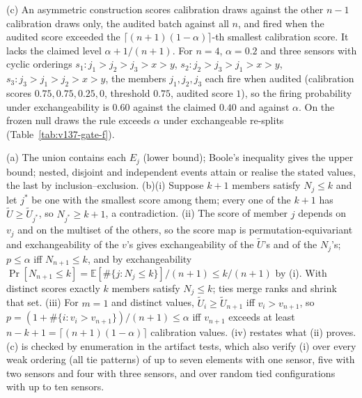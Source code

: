 \documentclass[10pt,journal,compsoc]{IEEEtran}
\begin{document}
(c) An asymmetric construction scores calibration draws against the other
$n-1$ calibration draws only, the audited batch against all $n$, and fired
when the audited score exceeded the $\lceil(n+1)(1-\alpha)\rceil$-th smallest
calibration score. It lacks the claimed level $\alpha+1/(n+1)$.
For $n=4$, $\alpha=0.2$ and three sensors with cyclic orderings
$s_1: j_1>j_2>j_3>x>y$, $s_2: j_2>j_3>j_1>x>y$, $s_3: j_3>j_1>j_2>x>y$,
the members $j_1,j_2,j_3$ each fire when audited (calibration scores
$0.75,0.75,0.25,0$, threshold $0.75$, audited score $1$), so the firing
probability under exchangeability is $0.60$ against the claimed $0.40$ and
against $\alpha$. On the frozen null draws the rule exceeds $\alpha$ under
exchangeable re-splits (Table~\ref{tab:v137-gate-f}).

\begin{IEEEproof}
(a) The union contains each $E_j$ (lower bound); Boole's inequality gives the
upper bound; nested, disjoint and independent events attain or realise the
stated values, the last by inclusion--exclusion. (b)(i) Suppose $k+1$ members
satisfy $N_j\le k$ and let $j^\ast$ be one with the smallest score among
them; every one of the $k+1$ has $\tilde U\ge\tilde U_{j^\ast}$, so
$N_{j^\ast}\ge k+1$, a contradiction. (ii) The score of member $j$ depends on
$v_j$ and on the multiset of the others, so the score map is
permutation-equivariant and exchangeability of the $v$'s gives
exchangeability of the $\tilde U$'s and of the $N_j$'s; $p\le\alpha$ iff
$N_{n+1}\le k$, and by exchangeability
$\Pr[N_{n+1}\le k]=\mathbb E[\#\{j:N_j\le k\}]/(n+1)\le k/(n+1)$ by (i).
With distinct scores exactly $k$ members satisfy $N_j\le k$; ties merge
ranks and shrink that set. (iii) For $m=1$ and distinct values,
$\tilde U_i\ge\tilde U_{n+1}$ iff $v_i>v_{n+1}$, so
$p=(1+\#\{i:v_i>v_{n+1}\})/(n+1)\le\alpha$ iff $v_{n+1}$ exceeds at least
$n-k+1=\lceil(n+1)(1-\alpha)\rceil$ calibration values. (iv) restates what
(ii) proves. (c) is checked by enumeration in the artifact tests, which also
verify (i) over every weak ordering (all tie patterns) of up to seven
elements with one sensor, five with two sensors and four with three sensors,
and over random tied configurations with up to ten sensors.
\end{IEEEproof}
\end{document}
